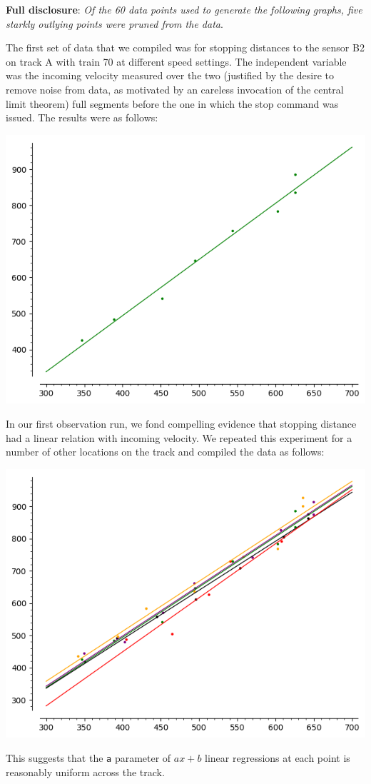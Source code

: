 \documentclass{amsart}
\begin{document}
\textbf{Full disclosure}: \textit{Of the 60 data points used to generate the following graphs, five starkly outlying points were pruned from the data}.

The first set of data that we compiled was for stopping distances to the sensor B2 on track A with train 70 at different speed settings. The independent variable was the incoming velocity measured over the two (justified by the desire to remove noise from data, as motivated by an careless invocation of the central limit theorem) full segments before the one in which the stop command was issued. The results were as follows:
\begin{center}
\includegraphics[scale=0.5]{x17s}
\end{center}
In our first observation run, we fond compelling evidence that stopping distance had a linear relation with incoming velocity. We repeated this experiment for a number of other locations on the track and compiled the data as follows:
\begin{center}
\includegraphics[scale=0.5]{all}
\end{center}
This suggests that the \texttt{a} parameter of $ax+b$ linear regressions at each point is reasonably uniform across the track.
\end{document}
